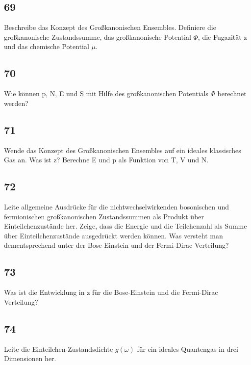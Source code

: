 \documentclass[12pt,a4paper]{report}
\newenvironment{myfrag}{\begin{it}}{\end{it}\vspace{3mm}\par}
\numberwithin{equation}{section}
\begin{document}
\subsection{69}
\begin{myfrag}
Beschreibe das Konzept des Großkanonischen Ensembles. Definiere die
großkanonische Zustandssumme, das großkanonische Potential $\Phi$, die
Fugazität z und das chemische Potential $\mu$.
\end{myfrag}
\subsection{70}
\begin{myfrag}
Wie können p, N, E und S mit Hilfe des großkanonischen Potentials $\Phi$
berechnet werden?
\end{myfrag}
\subsection{71}
\begin{myfrag}
Wende das Konzept des Großkanonischen Ensembles auf ein ideales
klassisches Gas an. Was ist z? Berechne E und p als Funktion von T, V und
N.
\end{myfrag}
\subsection{72}
\begin{myfrag}
Leite allgemeine Ausdrücke für die nichtwechselwirkenden bosonischen und
fermionischen großkanonischen Zustandssummen als Produkt über Einteilchenzustände
her. Zeige, dass die Energie und die Teilchenzahl als
Summe über Einteilchenzustände ausgedrückt werden können. Was versteht
man dementsprechend unter der Bose-Einstein und der Fermi-Dirac
Verteilung?
\end{myfrag}
\subsection{73}
\begin{myfrag}
Was ist die Entwicklung in z für die Bose-Einstein und die Fermi-Dirac
Verteilung?
\end{myfrag}
\subsection{74}
\begin{myfrag}
Leite die Einteilchen-Zustandsdichte $g(\omega )$ für ein ideales Quantengas in drei
Dimensionen her.
\end{myfrag}
\end{document}
